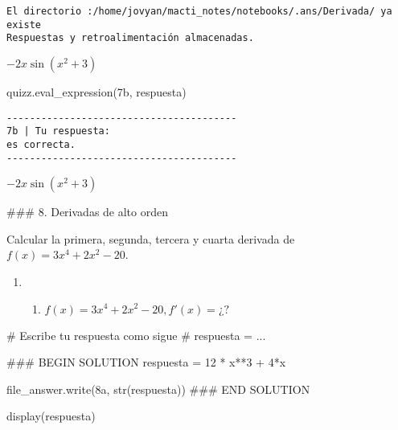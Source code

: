 \documentclass[
  letterpaper,
  DIV=11,
  numbers=noendperiod]{scrreprt}
\newenvironment{Shaded}{\begin{snugshade}}{\end{snugshade}}
\newcommand{\BuiltInTok}[1]{\textcolor[rgb]{0.00,0.23,0.31}{#1}}
\newcommand{\CommentTok}[1]{\textcolor[rgb]{0.37,0.37,0.37}{#1}}
\newcommand{\DecValTok}[1]{\textcolor[rgb]{0.68,0.00,0.00}{#1}}
\newcommand{\NormalTok}[1]{\textcolor[rgb]{0.00,0.23,0.31}{#1}}
\newcommand{\OperatorTok}[1]{\textcolor[rgb]{0.37,0.37,0.37}{#1}}
\newcommand{\RegionMarkerTok}[1]{\textcolor[rgb]{0.00,0.23,0.31}{#1}}
\newcommand{\StringTok}[1]{\textcolor[rgb]{0.13,0.47,0.30}{#1}}
\providecommand{\tightlist}{%
  \setlength{\itemsep}{0pt}\setlength{\parskip}{0pt}}\usepackage{longtable,booktabs,array}
\begin{document}
\begin{verbatim}
El directorio :/home/jovyan/macti_notes/notebooks/.ans/Derivada/ ya existe
Respuestas y retroalimentación almacenadas.
\end{verbatim}

$\displaystyle - 2 x \sin{\left(x^{2} + 3 \right)}$

\begin{Shaded}
\begin{Highlighting}[]
\NormalTok{quizz.eval\_expression(}\StringTok{\textquotesingle{}7b\textquotesingle{}}\NormalTok{, respuesta)}
\end{Highlighting}
\end{Shaded}

\begin{verbatim}
----------------------------------------
7b | Tu respuesta:
es correcta.
----------------------------------------
\end{verbatim}

$\displaystyle - 2 x \sin{\left(x^{2} + 3 \right)}$

\#\#\# 8. Derivadas de alto orden

Calcular la primera, segunda, tercera y cuarta derivada de
\(f(x)= 3x^4 + 2x^2 - 20\).

\begin{enumerate}
\def\labelenumi{\arabic{enumi}.}
\setcounter{enumi}{7}
\tightlist
\item
  \begin{enumerate}
  \def\labelenumii{\alph{enumii}.}
  \tightlist
  \item
    \(f(x) = 3x^4 + 2x^2 - 20, f'(x) = ¿?\)
  \end{enumerate}
\end{enumerate}

\begin{Shaded}
\begin{Highlighting}[]
\CommentTok{\# Escribe tu respuesta como sigue }
\CommentTok{\# respuesta = ...}

\CommentTok{\#\#\# }\RegionMarkerTok{BEGIN}\CommentTok{ SOLUTION}
\NormalTok{respuesta }\OperatorTok{=} \DecValTok{12} \OperatorTok{*}\NormalTok{ x}\OperatorTok{**}\DecValTok{3} \OperatorTok{+} \DecValTok{4}\OperatorTok{*}\NormalTok{x}

\NormalTok{file\_answer.write(}\StringTok{\textquotesingle{}8a\textquotesingle{}}\NormalTok{, }\BuiltInTok{str}\NormalTok{(respuesta))}
\CommentTok{\#\#\# }\RegionMarkerTok{END}\CommentTok{ SOLUTION}

\NormalTok{display(respuesta)}
\end{Highlighting}
\end{Shaded}
\end{document}
